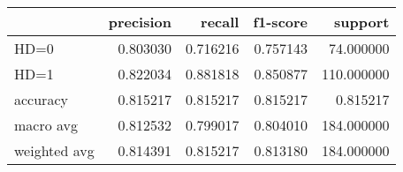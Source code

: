 \begin{tabular}{lrrrr}
\toprule
{} &  precision &    recall &  f1-score &     support \\
\midrule
HD=0         &   0.803030 &  0.716216 &  0.757143 &   74.000000 \\
HD=1         &   0.822034 &  0.881818 &  0.850877 &  110.000000 \\
accuracy     &   0.815217 &  0.815217 &  0.815217 &    0.815217 \\
macro avg    &   0.812532 &  0.799017 &  0.804010 &  184.000000 \\
weighted avg &   0.814391 &  0.815217 &  0.813180 &  184.000000 \\
\bottomrule
\end{tabular}
